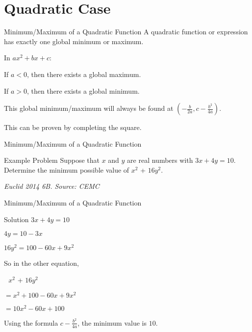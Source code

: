\section{Quadratic Case}
\begin{namedframe}{Minimum/Maximum of a Quadratic Function}
	A quadratic function or expression has exactly one global minimum or maximum.

	In $ax^2 + bx + c$:

	If $a < 0$, then there exists a global maximum.

	If $a > 0$, then there exists a global minimum.

	This global minimum/maximum will always be found at $(-\frac{b}{2a}, c - \frac{b^2}{4a})$.
	\pause

	This can be proven by completing the square.
\end{namedframe}

\begin{namedframe}{Minimum/Maximum of a Quadratic Function}
	\begin{exampleblock}{Example Problem}
		Suppose that $x$ and $y$ are real numbers with $3x + 4y = 10$. Determine the minimum possible value of $x^2$ + $16y^2$.
	\end{exampleblock}
	\textit{Euclid 2014 6B. Source: CEMC}
\end{namedframe}

\begin{namedframe}{Minimum/Maximum of a Quadratic Function}
	\begin{block}{Solution}
		$3x + 4y = 10$

		$4y = 10 - 3x$

		$16y^2 = 100 - 60x + 9x^2$

		\phantom{ }

		So in the other equation,

		$\ \ \ x^2$ + $16y^2$

		$ = x^2 + 100 - 60x + 9x^2$

		$ = 10x^2 - 60x + 100$

		Using the formula $c - \frac{b^2}{4a}$, the minimum value is $10$.
	\end{block}
\end{namedframe}
